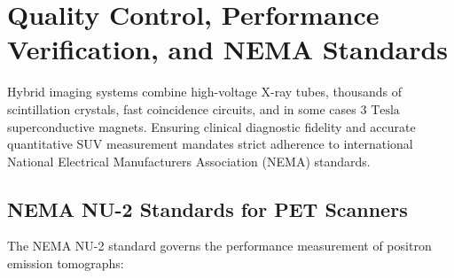 \documentclass[11pt,a4paper]{article}
\begin{document}
\section{Quality Control, Performance Verification, and NEMA Standards}
Hybrid imaging systems combine high-voltage X-ray tubes, thousands of scintillation crystals, fast coincidence circuits, and in some cases $3\text{ Tesla}$ superconductive magnets. Ensuring clinical diagnostic fidelity and accurate quantitative SUV measurement mandates strict adherence to international National Electrical Manufacturers Association (NEMA) standards.

\subsection{NEMA NU-2 Standards for PET Scanners}
The NEMA NU-2 standard governs the performance measurement of positron emission tomographs:
\end{document}

